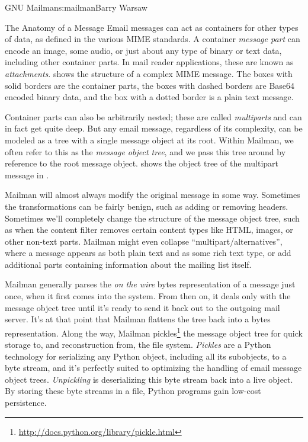 \begin{aosachapter}{GNU Mailman}{s:mailman}{Barry Warsaw}
\begin{aosasect1}{The Anatomy of a Message}
Email messages can act as containers for other types of data, as
defined in the various MIME standards.  A container \emph{message
  part} can encode an image, some audio, or just about any type of
binary or text data, including other container parts.  In mail reader applications, these are known as
\emph{attachments}.   shows the structure
of a complex MIME message.  The boxes with solid borders are the container parts,
the boxes with dashed borders are
Base64 encoded
binary data, and the box with a dotted border is a plain text message.

Container parts can also be arbitrarily nested; these are called
\emph{multiparts} and can in fact get quite deep.  But any email
message, regardless of its complexity, can be modeled as a tree with
a single message object at its root.  Within Mailman, we often refer
to this as the \emph{message object tree}, and we pass this tree
around by reference to the root message object.
 shows the object tree of the
multipart message in .


Mailman will almost always modify the original message in some way.
Sometimes the transformations can be fairly benign, such as adding or
removing headers.  Sometimes we'll completely change the structure of
the message object tree, such as when the content filter removes
certain content types like HTML, images, or other non-text parts.
Mailman might even collapse ``multipart/alternatives'', where a message
appears as both plain text and as some rich text type, or add
additional parts containing information about the mailing list itself.

Mailman generally parses the \emph{on the wire} bytes representation
of a message just once, when it first comes into the system.  From
then on, it deals only with the message object tree until it's ready
to send it back out to the outgoing mail server.  It's at that point
that Mailman flattens the tree back into a bytes representation.
Along the way, Mailman
pickles\footnote{\url{http://docs.python.org/library/pickle.html}} the
message object tree for quick storage to, and reconstruction from, the
file system.  \emph{Pickles} are a Python technology for serializing
any Python object, including all its subobjects, to a byte stream, and
it's perfectly suited to optimizing the handling of email message
object trees. \emph{Unpickling} is deserializing this byte stream back
into a live object.  By storing these byte streams in a file, Python
programs gain low-cost persistence.


\end{aosasect1}
\end{aosachapter}
